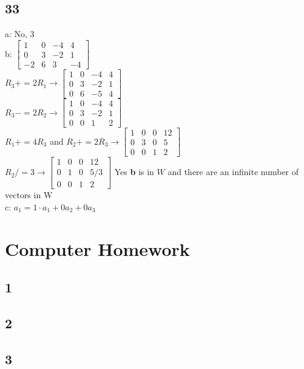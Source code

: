 \documentclass{article}
\begin{document}
\subsection*{33}
a: No, 3
\\b: 
$
\begin{bmatrix}
1 & 0 & -4 & 4 \\
0 & 3 & -2 & 1 \\
-2 & 6 & 3 & -4
\end{bmatrix}
$
\\$R_3+=2R_1 \rightarrow \begin{bmatrix}
    1 & 0 & -4 & 4 \\
    0 & 3 & -2 & 1 \\
    0 & 6 & -5 & 4
    \end{bmatrix}$ \\[0.1in]$R_3-=2R_2 \rightarrow
    \begin{bmatrix}
        1 & 0 & -4 & 4 \\
        0 & 3 & -2 & 1 \\
        0 & 0 & 1 & 2
        \end{bmatrix}
    $\\[0.1in]$R_1+=4R_3$ and $R_2+=2R_3 \rightarrow
    \begin{bmatrix}
        1 & 0 & 0 & 12 \\
        0 & 3 & 0 & 5 \\
        0 & 0 & 1 & 2
        \end{bmatrix}
    $ \\$R_2 /= 3 \rightarrow \begin{bmatrix}
        1 & 0 & 0 & 12 \\
        0 & 1 & 0 & 5/3 \\
        0 & 0 & 1 & 2
        \end{bmatrix}$ Yes \textbf{b} is in $W$ and there are an infinite number of vectors in W
\\c: $a_1=1\cdot a_1+ 0a_2 + 0a_3$ \checkmark
\section*{Computer Homework}
\subsection*{1}
\subsection*{2}
\subsection*{3}
\end{document}
